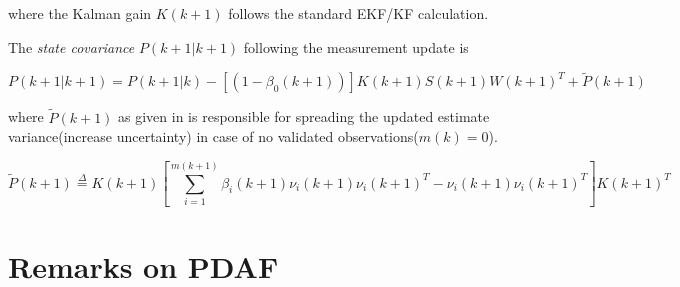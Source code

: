 where the Kalman gain $K(k+1)$ follows the standard EKF/KF calculation.

The \emph{state covariance} $P(k+1|k+1)$ following the measurement update is \cite{Kirubarajan2004}

$$
P(k+1|k+1) = P(k+1|k) -  [ (1-\beta_0(k+1)) ] K(k+1)S(k+1)W(k+1)^T + \tilde{P}(k+1)
$$

where $\tilde{P}(k+1)$ as given in  is responsible for spreading the updated estimate variance(increase uncertainty) in case of no validated observations($m(k)=0$).


\begin{equation}
\label{eq:spread}
\tilde{P}(k+1) \overset{\Delta}{=} K(k+1)\left[ \sum_{i=1}^{m(k+1)}\beta_i(k+1)\nu_i(k+1)\nu_i(k+1)^T - \nu_i(k+1)\nu_i(k+1)^T \right]K(k+1)^T
\end{equation}

\section{Remarks on PDAF}


